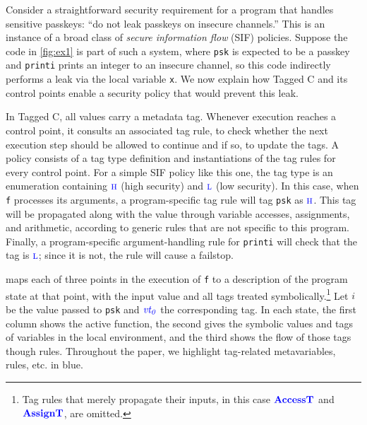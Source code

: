 \documentclass{llncs}
\begin{document}
Consider a straightforward security requirement for a program that handles sensitive passkeys:
``do not leak passkeys on insecure channels.'' This is an instance of a broad class of
{\em secure information flow} (SIF) policies. Suppose the code in \cref{fig:ex1} is part of
such a system, where {\tt psk} is expected to be a passkey and {\tt printi}
prints an integer to an insecure channel, so this code indirectly performs a leak via the
local variable {\tt x}. We now explain how Tagged C and its control points
enable a security policy that would prevent this leak.

In Tagged C, all values carry a metadata tag. Whenever execution reaches a control point, it consults
an associated tag rule, to check whether the next execution step should be allowed to continue and
if so, to update the tags. A policy consists of a tag type definition and instantiations of the tag rules for every control point.
For a simple SIF policy like this one, the tag type is an enumeration containing \(\high\) (high security) and \(\low\) (low security).
In this case, when {\tt f} processes its arguments, a program-specific tag rule 
will tag {\tt psk} as \(\high\). This tag will be propagated along with the value through variable accesses,
assignments, and arithmetic, according to generic rules that are not specific to this program. Finally, a program-specific
argument-handling rule for {\tt printi} will check that the tag is \(\low\); since it is not, the rule will
cause a failstop.

 maps each of three points in the execution of {\tt f} to a description of the program
state at that point, with the input value and all tags treated symbolically.\footnote{
Tag rules that merely propagate their inputs,
in this case \(\accesstname\) and \(\assigntname\), are omitted.}
Let \(i\) be the value passed to {\tt psk}
and \(\vt[_0]\) the corresponding tag. In each state, the first column
shows the active function, the second gives the symbolic values and tags
of variables in the local environment, and the third shows the flow of those tags though
rules. Throughout the paper, we highlight tag-related metavariables, rules, etc. in {\color{blue}blue}.
\end{document}
